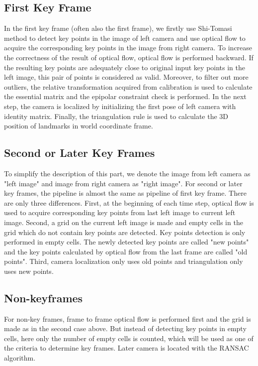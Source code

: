 \documentclass[11pt]{easychair}
\begin{document}
\subsection{First Key Frame}
In the first key frame (often also the first frame), we firstly use Shi-Tomasi method to detect key points in the image of left camera and use optical flow to acquire the corresponding key points in the image from right camera. To increase the correctness of the result of optical flow, optical flow is performed backward. If the resulting key points are adequately close to original input key points in the left image, this pair of points is considered as valid. Moreover, to filter out more outliers, the relative transformation acquired from calibration is used to calculate the essential matrix and the epipolar constraint check is performed. In the next step, the camera is localized by initializing the first pose of left camera with identity matrix. Finally, the triangulation rule is used to calculate the 3D position of landmarks in world coordinate frame. 

\subsection{Second or Later Key Frames}
To simplify the description of this part, we denote the image from left camera as "left image" and image from right camera as "right image". For second or later key frames, the pipeline is almost the same as pipeline of first key frame. There are only three differences. First, at the beginning of each time step, optical flow is used to acquire corresponding key points from last left image to current left image. Second, a grid on the current left image is made and empty cells in the grid which do not contain key points are detected. Key points detection is only performed in empty cells. The newly detected key points are called "new points" and the key points calculated by optical flow from the last frame are called "old points". Third, camera localization only uses old points and triangulation only uses new points.

\subsection{Non-keyframes}
For non-key frames, frame to frame optical flow is performed first and the grid is made as in the second case above. But instead of detecting key points in empty cells, here only the number of empty cells is counted, which will be used as one of the criteria to determine key frames. Later camera is located with the RANSAC algorithm.
\end{document}
